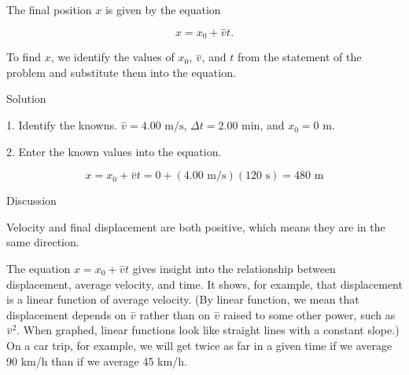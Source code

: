 \documentclass[
]{book}
\begin{document}
The final position \(x{}\) is given by the equation

\leavevmode{}%
\[{{{x = {x_{0} + \overset{-}{v}}}t}.}{}\]

To find \(x{}\), we identify the values of \(x_{0}{}\),
\emph{\(\overset{-}{v}{}\)}, and \(t{}\)\emph{} from the
statement of the problem and substitute them into the equation.

{Solution}

1. Identify the knowns.
\({{\overset{-}{v} = 4}\text{.}\text{00\ m/s}}{}\),
\({{\Delta t = 2}\text{.}\text{00\ min}}{}\), and
\({x_{0} = \text{0\ m}}{}\).\emph{}

2. Enter the known values into the equation.

\leavevmode{}%
\[{{x = {x_{0} + \overset{-}{v}}}{t = {0 + \left( {4\text{.}\text{00\ m/s}} \right)}}{\left( \text{120\ s} \right) = \text{480\ m}}}{}\]

{Discussion}

Velocity and final displacement are both positive, which means they are
in the same direction.

The equation \({{x = {x_{0} + \overset{-}{v}}}t}{}\) gives insight into
the relationship between displacement, average velocity, and time. It
shows, for example, that displacement is a linear function of average
velocity. (By linear function, we mean that displacement depends on
\emph{\(\overset{-}{v}{}\)} rather than on \emph{\(\overset{-}{v}{}\)} raised to some
other power, such as \emph{\({\overset{-}{v}}^{2}{}\)}. When graphed, linear
functions look like straight lines with a constant slope.) On a car
trip, for example, we will get twice as far in a given time if we
average 90 km/h than if we average 45 km/h.
\end{document}
